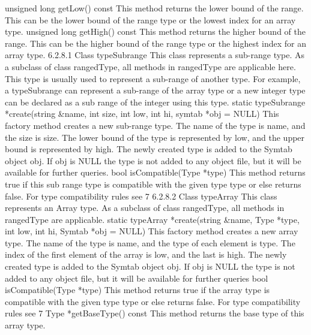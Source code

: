 unsigned long getLow() const
This method returns the lower bound of the range. 
This can be the lower bound of the range type or the lowest index for an array type.
unsigned long getHigh() const
This method returns the higher bound of the range. 
This can be the higher bound of the range type or the highest index for an array type.
6.2.8.1 Class typeSubrange
This class represents a sub-range type. As a subclass of class rangedType, all methods in rangedType are applicable here. This type is usually used to represent a sub-range of another type. For example, a typeSubrange can represent a sub-range of the array type or a new integer type can be declared as a sub range of the integer using this type.
static typeSubrange *create(string &name, int size, int low, int hi, 
symtab *obj = NULL) 
This factory method creates a new sub-range type. The name of the type is name, and the size is size. The lower bound of the type is represented by low, and the upper bound is represented by high. 
The newly created type is added to the Symtab object obj. If obj is NULL the type is not added to any object file, but it will be available for further queries.
bool isCompatible(Type *type)
This method returns true if this sub range type is compatible with the given type type or else returns false. For type compatibility rules see 7
6.2.8.2 Class typeArray
This class represents an Array type. As a subclass of class rangedType, all methods in rangedType are applicable. 
static typeArray *create(string &name, Type *type, int low, int hi, 
Symtab *obj = NULL) 
This factory method creates a new array type. The name of the type is name, and the type of each element is type. The index of the first element of the array is low, and the last is high. 
The newly created type is added to the Symtab object obj. If obj is NULL the type is not added to any object file, but it will be available for further queries
bool isCompatible(Type *type)
This method returns true if the array type is compatible with the given type type or else returns false. For type compatibility rules see 7
Type *getBaseType() const
This method returns the base type of this array type.


